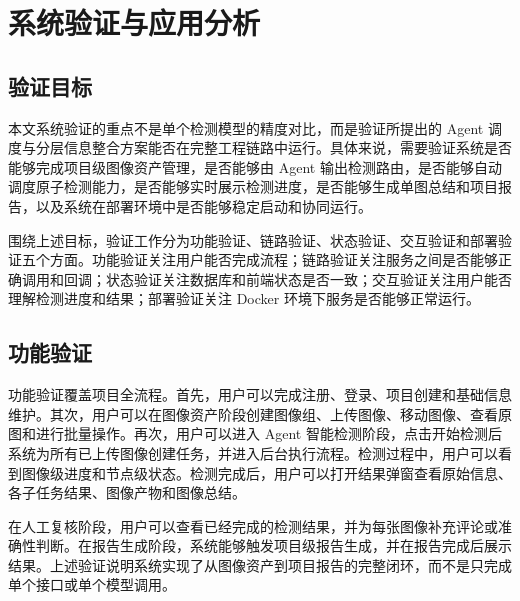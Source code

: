 \chapter{系统验证与应用分析}
\label{chap:validation}

\section{验证目标}
\label{sec:validation-goal}

本文系统验证的重点不是单个检测模型的精度对比，而是验证所提出的 Agent 调度与分层信息整合方案能否在完整工程链路中运行。具体来说，需要验证系统是否能够完成项目级图像资产管理，是否能够由 Agent 输出检测路由，是否能够自动调度原子检测能力，是否能够实时展示检测进度，是否能够生成单图总结和项目报告，以及系统在部署环境中是否能够稳定启动和协同运行。

围绕上述目标，验证工作分为功能验证、链路验证、状态验证、交互验证和部署验证五个方面。功能验证关注用户能否完成流程；链路验证关注服务之间是否能够正确调用和回调；状态验证关注数据库和前端状态是否一致；交互验证关注用户能否理解检测进度和结果；部署验证关注 Docker 环境下服务是否能够正常运行。

\section{功能验证}
\label{sec:function-validation}

功能验证覆盖项目全流程。首先，用户可以完成注册、登录、项目创建和基础信息维护。其次，用户可以在图像资产阶段创建图像组、上传图像、移动图像、查看原图和进行批量操作。再次，用户可以进入 Agent 智能检测阶段，点击开始检测后系统为所有已上传图像创建任务，并进入后台执行流程。检测过程中，用户可以看到图像级进度和节点级状态。检测完成后，用户可以打开结果弹窗查看原始信息、各子任务结果、图像产物和图像总结。

在人工复核阶段，用户可以查看已经完成的检测结果，并为每张图像补充评论或准确性判断。在报告生成阶段，系统能够触发项目级报告生成，并在报告完成后展示结果。上述验证说明系统实现了从图像资产到项目报告的完整闭环，而不是只完成单个接口或单个模型调用。

